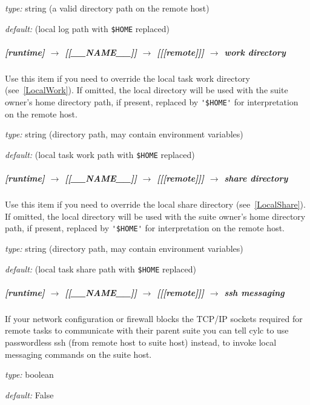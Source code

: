 \begin{myitemize}
\item {\em type:} string (a valid directory path on the remote host)
\item {\em default:} (local log path with \lstinline=$HOME= replaced)
\end{myitemize}
 
\subparagraph[work directory]{[runtime] $\rightarrow$ [[\_\_NAME\_\_]] $\rightarrow$ [[[remote]]] $\rightarrow$ work directory}

Use this item if you need to override the local task work directory 
(see~\ref{LocalWork}). If omitted, the local directory will be used with
the suite owner's home directory path, if present,
replaced by \lstinline='$HOME'= for interpretation on 
the remote host.

\begin{myitemize}
\item {\em type:} string (directory path, may contain environment variables)
\item {\em default:} (local task work path with \lstinline=$HOME= replaced)
\end{myitemize}

\subparagraph[share directory]{[runtime] $\rightarrow$ [[\_\_NAME\_\_]] $\rightarrow$ [[[remote]]] $\rightarrow$ share directory}

Use this item if you need to override the local share directory 
(see~\ref{LocalShare}). If omitted, the local directory will be used
with the suite owner's home directory path, if present, replaced by
\lstinline='$HOME'= for interpretation on the remote host.

\begin{myitemize}
\item {\em type:} string (directory path, may contain environment variables)
\item {\em default:} (local task share path with \lstinline=$HOME= replaced)
\end{myitemize}

\subparagraph[ssh messaging]{[runtime] $\rightarrow$ [[\_\_NAME\_\_]] $\rightarrow$ [[[remote]]] $\rightarrow$ ssh messaging}

If your network configuration or firewall blocks the TCP/IP sockets
required for remote tasks to communicate with their parent suite
you can tell cylc to use passwordless ssh (from remote host to suite
host) instead, to invoke local messaging commands on the suite host.

\begin{myitemize}
\item {\em type:} boolean
\item {\em default:} False
\end{myitemize}


